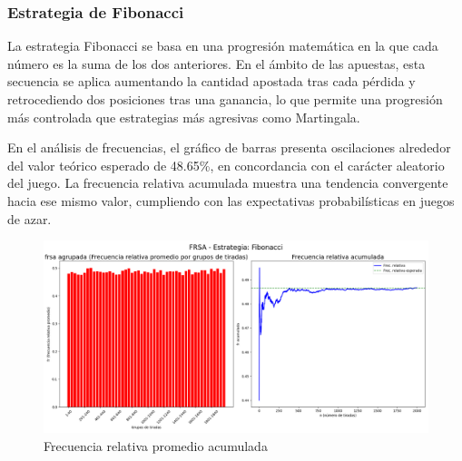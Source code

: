 \documentclass{article}
\begin{document}
\subsubsection{Estrategia de Fibonacci}
La estrategia Fibonacci se basa en una progresión matemática en la que cada número es la suma de los dos anteriores. En el ámbito de las apuestas, esta secuencia se aplica aumentando la cantidad apostada tras cada pérdida y retrocediendo dos posiciones tras una ganancia, lo que permite una progresión más controlada que estrategias más agresivas como Martingala.

En el análisis de frecuencias, el gráfico de barras presenta oscilaciones alrededor del valor teórico esperado de 48.65\%, en concordancia con el carácter aleatorio del juego. La frecuencia relativa acumulada muestra una tendencia convergente hacia ese mismo valor, cumpliendo con las expectativas probabilísticas en juegos de azar.
\begin{figure}[H]
    \centering \includegraphics[width=1\linewidth]{Imagenes/frsa_Fibonacci.png}
    \caption{Frecuencia relativa promedio acumulada}
    \label{fig:enter-label}
 \end{figure}
\end{document}
